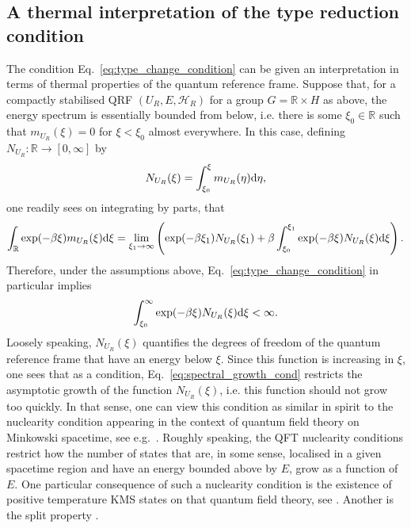 \documentclass[sn-mathphys-num]{sn-jnl}%
\newcommand{\RR}{\mathbb{R}}
\newcommand{\HH}{\mathcal{H}}
\newcommand{\diff}{\textup{d}}
\numberwithin{equation}{section}
\theoremstyle{thmstyleone}%
\theoremstyle{thmstyletwo}%
\theoremstyle{thmstylethree}%
\begin{document}
\subsection{A thermal interpretation of the type reduction condition}
\label{sec:thermal_int}
The condition Eq.~\eqref{eq:type_change_condition} can be given an interpretation in terms of thermal properties of the quantum reference frame. Suppose that, for a compactly stabilised QRF $(U_R,E,\HH_R)$ for a group $G=\RR\times H$ as above, the energy spectrum is essentially bounded from below, i.e. there is some $\xi_0\in\RR$ such that $m_{U_R}(\xi)=0$ for $\xi<\xi_0$ almost everywhere. In this case, defining $N_{U_R}:\RR\to[0,\infty]$ by
\begin{equation}
    N_{U_R}(\xi)=\int_{\xi_0}^{\xi} m_{U_R}(\eta)\diff\eta,
\end{equation}
one readily sees on integrating by parts, that 
\begin{equation}
    \int_\RR\exp(-\beta\xi)m_{U_R}(\xi)\diff\xi=\lim_{\xi_1\to\infty}\left(\exp(-\beta\xi_1)N_{U_R}(\xi_1)+\beta\int_{\xi_0}^{\xi_1}\exp(-\beta\xi)N_{U_R}(\xi)\diff\xi\right).
\end{equation}
Therefore, under the assumptions above, Eq.\ \eqref{eq:type_change_condition} in particular implies
\begin{equation}
    \label{eq:spectral_growth_cond}
    \int_{\xi_0}^{\infty}\exp(-\beta\xi)N_{U_R}(\xi)\diff\xi<\infty.
\end{equation}
Loosely speaking, $N_{U_R}(\xi)$ quantifies the degrees of freedom of the quantum reference frame that have an energy below $\xi$. Since this function is increasing in $\xi$, one sees that as a condition, Eq.\ \eqref{eq:spectral_growth_cond} restricts the asymptotic growth of the function $N_{U_R}(\xi)$, i.e. this function should not grow too quickly. In that sense, one can view this condition as similar in spirit to the nuclearity condition appearing in the context of quantum field theory on Minkowski spacetime, see e.g.\ \cite{Buchholz:1986dy}. Roughly speaking, the QFT nuclearity conditions restrict how the number of states that are, in some sense, localised in a given spacetime region and have an energy bounded above by $E$, grow as a function of $E$. One particular consequence of such a nuclearity condition is the existence of positive temperature KMS states on that quantum field theory, see \cite{Buchholz:1988fk}. Another is the split property \cite{Buchholz1987Universal}.
\end{document}
